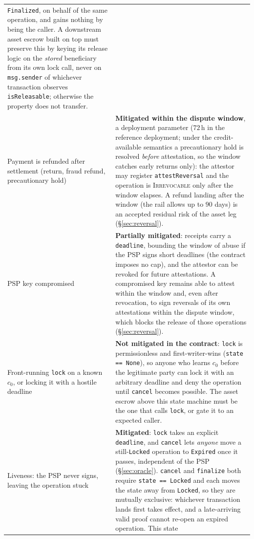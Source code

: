 \documentclass[11pt]{article}
\newcommand{\code}[1]{\texttt{#1}}
\begin{document}
{\begin{longtable}{@{}p{}p{}@{}}
\code{Finalized}, on behalf of the same operation, and gains nothing by being
the caller. A downstream asset escrow built on top must preserve this by keying
its release logic on the \emph{stored} beneficiary from its own lock call,
never on \code{msg.sender} of whichever transaction observes
\code{isReleasable}; otherwise the property does not transfer. \\[2pt]
Payment is refunded after settlement (return, fraud refund, precautionary hold)
& \textbf{Mitigated within the dispute window}, a deployment parameter ($72$\,h in
the reference deployment; under the credit-available semantics a precautionary
hold is resolved \emph{before} attestation, so the window catches early returns
only): the attestor may register \code{attestReversal} and the operation is
\textsc{Irrevocable} only after the window elapses. A refund landing after the
window (the rail allows up to $90$ days) is an accepted residual risk of the
asset leg (\S\ref{sec:reversal}). \\[2pt]
PSP key compromised
& \textbf{Partially mitigated}: receipts carry a \code{deadline}, bounding the
window of abuse if the PSP signs short deadlines (the contract imposes no cap),
and the attestor can be revoked for future attestations. A compromised key
remains able to attest within the window and, even after revocation, to sign
reversals of its own attestations within the dispute window, which blocks the
release of those operations (\S\ref{sec:reversal}). \\[2pt]
Front-running \code{lock} on a known $c_0$, or locking it with a hostile deadline
& \textbf{Not mitigated in the contract}: \code{lock} is permissionless and
first-writer-wins (\code{state == None}), so anyone who learns $c_0$ before the
legitimate party can lock it with an arbitrary deadline and deny the operation
until \code{cancel} becomes possible. The asset escrow above this state machine
must be the one that calls \code{lock}, or gate it to an expected caller. \\[2pt]
Liveness: the PSP never signs, leaving the operation stuck
& \textbf{Mitigated}: \code{lock} takes an explicit \code{deadline}, and
\code{cancel} lets \emph{anyone} move a still-\code{Locked} operation to
\code{Expired} once it passes, independent of the PSP
(\S\ref{sec:oracle}). \code{cancel} and \code{finalize} both require
\code{state == Locked} and each moves the state away from \code{Locked}, so
they are mutually exclusive: whichever transaction lands first takes effect,
and a late-arriving valid proof cannot re-open an expired operation. This state

\end{longtable}}
\end{document}
